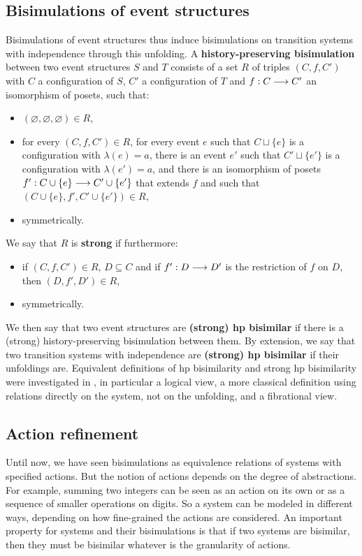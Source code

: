 	\subsection{Bisimulations of event structures}
	
	Bisimulations of event structures thus induce bisimulations on transition systems with independence through this unfolding. A \textbf{history-preserving bisimulation} \cite{rabinovitch88} between two event structures $S$ and $T$ consists of a set $R$ of triples $(C,f,C')$ with $C$ a configuration of $S$, $C'$ a configuration of $T$ and $f : C \longrightarrow C'$ an isomorphism of posets, such that:
	\begin{itemize}
		\item $(\varnothing,\varnothing,\varnothing) \in R$,
		\item for every $(C,f,C') \in R$, for every event $e$ such that $C\sqcup\{e\}$ is a configuration with $\lambda(e) = a$, there is an event $e'$ such that $C'\sqcup\{e'\}$ is a configuration with $\lambda(e') = a$, and there is an isomorphism of posets $f' : C\cup\{e\} \longrightarrow C'\cup\{e'\}$ that extends $f$ and such that $(C\cup\{e\},f',C'\cup\{e'\}) \in R$,
		\item symmetrically.
	\end{itemize}
\noindent We say that $R$ is \textbf{strong} if furthermore:
	\begin{itemize}
		\item if $(C,f,C') \in R$, $D \subseteq C$ and if $f' : D \longrightarrow D'$ is the restriction of $f$ on $D$, then $(D,f',D') \in R$,
		\item symmetrically.
	\end{itemize}
\noindent We then say that two event structures are \textbf{(strong) hp bisimilar} if there is a (strong) history-preserving bisimulation between them. By extension, we say that two transition systems with independence are \textbf{(strong) hp bisimilar} if their unfoldings are. Equivalent definitions of hp bisimilarity and strong hp bisimilarity were investigated in \cite{joyal96}, in particular a logical view, a more classical definition using relations directly on the system, not on the unfolding, and a fibrational view.

	\subsection{Action refinement}
	\label{subsec:actref}

Until now, we have seen bisimulations as equivalence relations of systems with specified actions. But the notion of actions depends on the degree of abstractions. For example, summing two integers can be seen as an action on its own or as a sequence of smaller operations on digits. So a system can be modeled in different ways, depending on how fine-grained the actions are considered. An important property for systems and their bisimulations is that if two systems are bisimilar, then they must be bisimilar whatever is the granularity of actions. 

